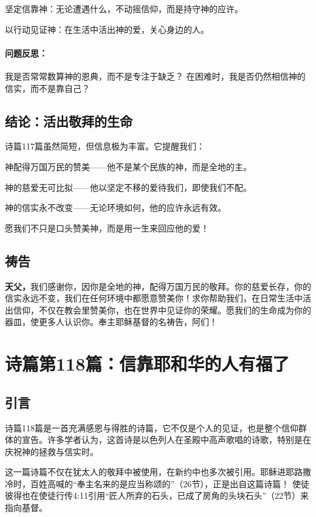 \documentclass[a4paper, 12pt]{article}
\begin{document}
坚定信靠神：无论遭遇什么，不动摇信仰，而是持守神的应许。

以行动见证神：在生活中活出神的爱，关心身边的人。


\paragraph*{问题反思：}

我是否常常数算神的恩典，而不是专注于缺乏？
在困难时，我是否仍然相信神的信实，而不是靠自己？
\subsection*{结论：活出敬拜的生命}
诗篇117篇虽然简短，但信息极为丰富。它提醒我们：

神配得万国万民的赞美——他不是某个民族的神，而是全地的主。

神的慈爱无可比拟——他以坚定不移的爱待我们，即使我们不配。

神的信实永不改变——无论环境如何，他的应许永远有效。

愿我们不只是口头赞美神，而是用一生来回应他的爱！

\subsection*{祷告}
\textbf{天父，}我们感谢你，因你是全地的神，配得万国万民的敬拜。你的慈爱长存，你的信实永远不变，我们在任何环境中都愿意赞美你！求你帮助我们，在日常生活中活出信仰，不仅在教会里赞美你，也在世界中见证你的荣耀。愿我们的生命成为你的器皿，使更多人认识你。奉主耶稣基督的名祷告，阿们！
\newpage
\section{诗篇第118篇：信靠耶和华的人有福了}

\subsection*{引言}
\hspace{0.6cm}诗篇118篇是一首充满感恩与得胜的诗篇，它不仅是个人的见证，也是整个信仰群体的宣告。许多学者认为，这首诗是以色列人在圣殿中高声歌唱的诗歌，特别是在庆祝神的拯救与信实时。

这一篇诗篇不仅在犹太人的敬拜中被使用，在新约中也多次被引用。耶稣进耶路撒冷时，百姓高喊的“奉主名来的是应当称颂的”（26节），正是出自这篇诗篇！ 使徒彼得也在使徒行传4:11引用“匠人所弃的石头，已成了房角的头块石头”（22节）来指向基督。
\end{document}
